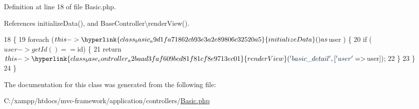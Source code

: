 Definition at line 18 of file Basic.\+php.



References initialize\+Data(), and Base\+Controller\textbackslash{}render\+View().


\begin{DoxyCode}
18                                    \{
19         \textcolor{keywordflow}{foreach} ($this->\hyperlink{class_basic_a9d1fa71862cb93e3a2e89806c32520a5}{initializeData}() as $user ) \{
20             \textcolor{keywordflow}{if} ($user->getId() == $id) \{
21                 \textcolor{keywordflow}{return} $this->\hyperlink{class_base_controller_a2baad3faf609bcd81f81cf8e9713ec01}{renderView}(\textcolor{stringliteral}{'basic\_detail'}, [\textcolor{stringliteral}{'user'} => $user]);
22             \}
23         \}
24     \}
\end{DoxyCode}


The documentation for this class was generated from the following file\+:\begin{DoxyCompactItemize}
\item 
C\+:/xampp/htdocs/mvc-\/framework/application/controllers/\hyperlink{controllers_2_basic_8php}{Basic.\+php}\end{DoxyCompactItemize}
